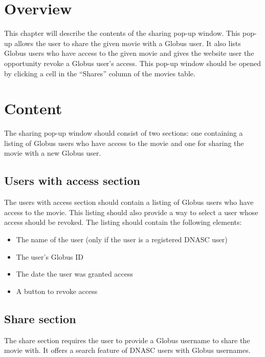 
\section{Overview}

This chapter will describe the contents of the sharing pop-up window. This pop-up allows 
the user to share the given movie with a Globus user. It also lists Globus users who 
have access to the given movie and gives the website user the opportunity revoke a 
Globus user's access. This pop-up window should be opened by clicking a cell in 
the ``Shares'' column of the movies table.

\section{Content}

The sharing pop-up window should consist of two sections: one containing a listing of
Globus users who have access to the movie and one for sharing the movie with a new
Globus user. 

\subsection{Users with access section}

The users with access section should contain a listing of Globus users who have access 
to the movie. This listing should also provide a way to select a user whose access should 
be revoked. The listing should contain the following elements:

\begin{itemize}\itemsep1pt
    \item The name of the user (only if the user is a registered DNASC user)
    \item The user's Globus ID
    \item The date the user was granted access
    \item A button to revoke access
\end{itemize}

\subsection{Share section}

The share section requires the user to provide a Globus username to share the movie with.
It offers a search feature of DNASC users with Globus usernames.

